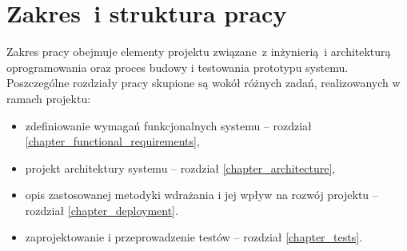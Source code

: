 \section{Zakres~i struktura pracy} \label{intro_scope}

Zakres pracy obejmuje elementy projektu związane~z inżynierią~i architekturą
oprogramowania oraz proces budowy i testowania prototypu systemu. Poszczególne
rozdziały pracy skupione są wokół różnych zadań, realizowanych w ramach projektu: 

\begin{itemize}
    \item zdefiniowanie wymagań funkcjonalnych systemu -- rozdział \ref{chapter_functional_requirements},
    \item projekt architektury systemu -- rozdział \ref{chapter_architecture},
    \item opis zastosowanej metodyki wdrażania i jej wpływ na rozwój projektu -- rozdział \ref{chapter_deployment}. 
    \item zaprojektowanie i przeprowadzenie testów -- rozdział \ref{chapter_tests}.
\end{itemize}

